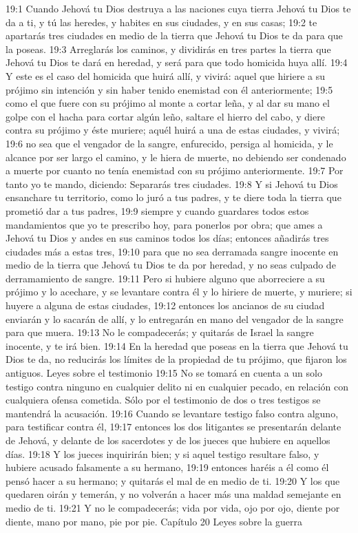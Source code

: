 19:1 Cuando Jehová tu Dios destruya a las naciones cuya tierra Jehová tu Dios te da a ti, y tú las heredes, y habites en sus ciudades, y en sus casas;  
19:2 te apartarás tres ciudades en medio de la tierra que Jehová tu Dios te da para que la poseas.  
19:3 Arreglarás los caminos, y dividirás en tres partes la tierra que Jehová tu Dios te dará en heredad, y será para que todo homicida huya allí.  
19:4 Y este es el caso del homicida que huirá allí, y vivirá: aquel que hiriere a su prójimo sin intención y sin haber tenido enemistad con él anteriormente;  
19:5 como el que fuere con su prójimo al monte a cortar leña, y al dar su mano el golpe con el hacha para cortar algún leño, saltare el hierro del cabo, y diere contra su prójimo y éste muriere; aquél huirá a una de estas ciudades, y vivirá;  
19:6 no sea que el vengador de la sangre, enfurecido, persiga al homicida, y le alcance por ser largo el camino, y le hiera de muerte, no debiendo ser condenado a muerte por cuanto no tenía enemistad con su prójimo anteriormente.  
19:7 Por tanto yo te mando, diciendo: Separarás tres ciudades.  
19:8 Y si Jehová tu Dios ensanchare tu territorio, como lo juró a tus padres, y te diere toda la tierra que prometió dar a tus padres,  
19:9 siempre y cuando guardares todos estos mandamientos que yo te prescribo hoy, para ponerlos por obra; que ames a Jehová tu Dios y andes en sus caminos todos los días; entonces añadirás tres ciudades más a estas tres,  
19:10 para que no sea derramada sangre inocente en medio de la tierra que Jehová tu Dios te da por heredad, y no seas culpado de derramamiento de sangre.  
19:11 Pero si hubiere alguno que aborreciere a su prójimo y lo acechare, y se levantare contra él y lo hiriere de muerte, y muriere; si huyere a alguna de estas ciudades,  
19:12 entonces los ancianos de su ciudad enviarán y lo sacarán de allí, y lo entregarán en mano del vengador de la sangre para que muera.  
19:13 No le compadecerás; y quitarás de Israel la sangre inocente, y te irá bien.  
19:14 En la heredad que poseas en la tierra que Jehová tu Dios te da, no reducirás los límites de la propiedad de tu prójimo, que fijaron los antiguos.  
Leyes sobre el testimonio  
19:15 No se tomará en cuenta a un solo testigo contra ninguno en cualquier delito ni en cualquier pecado, en relación con cualquiera ofensa cometida. Sólo por el testimonio de dos o tres testigos se mantendrá la acusación. 
19:16 Cuando se levantare testigo falso contra alguno, para testificar contra él,  
19:17 entonces los dos litigantes se presentarán delante de Jehová, y delante de los sacerdotes y de los jueces que hubiere en aquellos días.  
19:18 Y los jueces inquirirán bien; y si aquel testigo resultare falso, y hubiere acusado falsamente a su hermano,  
19:19 entonces haréis a él como él pensó hacer a su hermano; y quitarás el mal de en medio de ti.  
19:20 Y los que quedaren oirán y temerán, y no volverán a hacer más una maldad semejante en medio de ti.  
19:21 Y no le compadecerás; vida por vida, ojo por ojo, diente por diente, mano por mano, pie por pie.  
Capítulo 20 
Leyes sobre la guerra  

